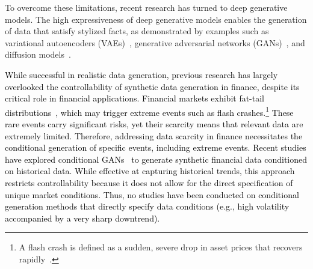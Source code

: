 \documentclass{article}
\newcommand{\takehiro}[1]{\textcolor{black}{#1}}
\begin{document}
To overcome these limitations, recent research has turned to deep generative models. 
The high expressiveness of deep generative models enables the generation of data that satisfy stylized facts, as demonstrated by examples such as variational autoencoders (VAEs)~\cite{vae}, generative adversarial networks (GANs)~\cite{gan}, and diffusion models~\cite{ho2020denoising}.

\takehiro{
While successful in realistic data generation, previous research has largely overlooked the controllability of synthetic data generation in finance, despite its critical role in financial applications. Financial markets exhibit fat-tail distributions~\cite{stylized_facts}, which may trigger extreme events such as flash crashes.\footnote{A flash crash is defined as a sudden, severe drop in asset prices that recovers rapidly~\cite{kirilenko2017flash}.} These rare events carry significant risks, yet their scarcity means that relevant data are extremely limited. Therefore, addressing data scarcity in finance necessitates the conditional generation of specific events, including extreme events. Recent studies have explored conditional GANs~\cite{mirza2014conditionalgenerativeadversarialnets,gan_time_series,li2020generating,wiese2020quant} to generate synthetic financial data conditioned on historical data. While effective at capturing historical trends, this approach restricts controllability because it does not allow for the direct specification of unique market conditions. Thus, no studies have been conducted on conditional generation methods that directly specify data conditions (e.g., high volatility accompanied by a very sharp downtrend).}
\end{document}

